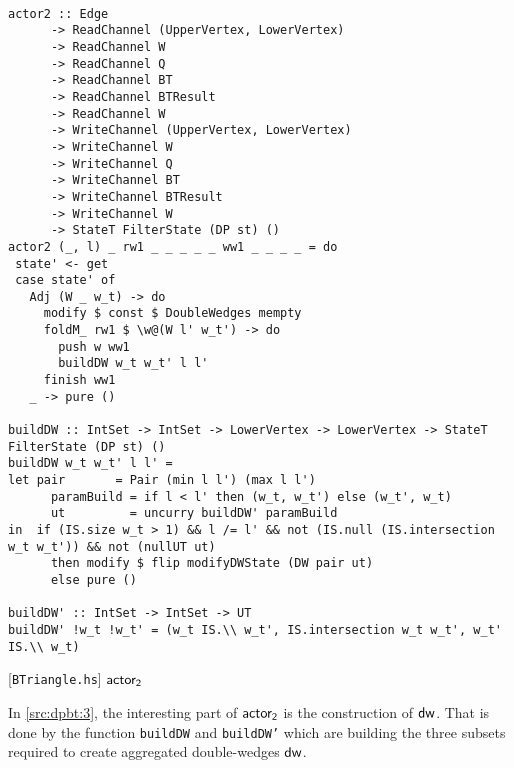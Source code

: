 \begin{listing}[htp!]
\begin{verbatim}

actor2 :: Edge
      -> ReadChannel (UpperVertex, LowerVertex)
      -> ReadChannel W
      -> ReadChannel Q
      -> ReadChannel BT
      -> ReadChannel BTResult
      -> ReadChannel W
      -> WriteChannel (UpperVertex, LowerVertex)
      -> WriteChannel W
      -> WriteChannel Q
      -> WriteChannel BT
      -> WriteChannel BTResult
      -> WriteChannel W
      -> StateT FilterState (DP st) ()
actor2 (_, l) _ rw1 _ _ _ _ _ ww1 _ _ _ _ = do
 state' <- get
 case state' of
   Adj (W _ w_t) -> do
     modify $ const $ DoubleWedges mempty
     foldM_ rw1 $ \w@(W l' w_t') -> do
       push w ww1
       buildDW w_t w_t' l l'
     finish ww1
   _ -> pure ()

buildDW :: IntSet -> IntSet -> LowerVertex -> LowerVertex -> StateT FilterState (DP st) ()
buildDW w_t w_t' l l' =
let pair       = Pair (min l l') (max l l')
      paramBuild = if l < l' then (w_t, w_t') else (w_t', w_t)
      ut         = uncurry buildDW' paramBuild
in  if (IS.size w_t > 1) && l /= l' && not (IS.null (IS.intersection w_t w_t')) && not (nullUT ut)
      then modify $ flip modifyDWState (DW pair ut)
      else pure ()

buildDW' :: IntSet -> IntSet -> UT
buildDW' !w_t !w_t' = (w_t IS.\\ w_t', IS.intersection w_t w_t', w_t' IS.\\ w_t)

\end{verbatim}
\caption{[\texttt{BTriangle.hs}] $\ab$}
\label{src:dpbt:3}
\end{listing}

In \autoref{src:dpbt:3}, the interesting part of $\mathsf{actor_2}$ is the construction of $\mathsf{dw}$. That is done by the function \texttt{buildDW}
and \texttt{buildDW'} which are building the three subsets required to create aggregated double-wedges $\mathsf{dw}$.

